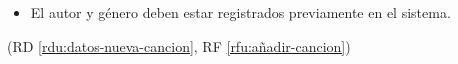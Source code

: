 %
%
\begin{itemize}
\item El autor y género deben estar registrados previamente en el sistema.
\end{itemize}
(RD \ref{rdu:datos-nueva-cancion}, RF \ref{rfu:añadir-cancion})

